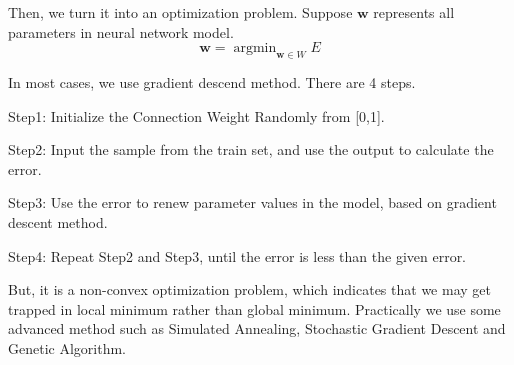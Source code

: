 \documentclass{article}
\begin{document}
Then, we turn it into an optimization problem. Suppose $\bm{w}$ represents all parameters in neural network model.
$$\bm{w}=\mathop{\arg\min}_{\bm{w}\in W}E$$

In most cases, we use gradient descend method. There are 4 steps.

Step1: Initialize the Connection Weight Randomly from [0,1].

Step2: Input the sample from the train set, and use the output to calculate the error.

Step3: Use the error to renew parameter values in the model, based on gradient descent method.

Step4: Repeat Step2 and Step3, until the error is less than the given error.

But, it is a non-convex optimization problem, which indicates that we may get trapped in local minimum rather than global minimum. Practically we use some
 advanced method such as Simulated Annealing, Stochastic Gradient Descent and Genetic Algorithm.
\end{document}
